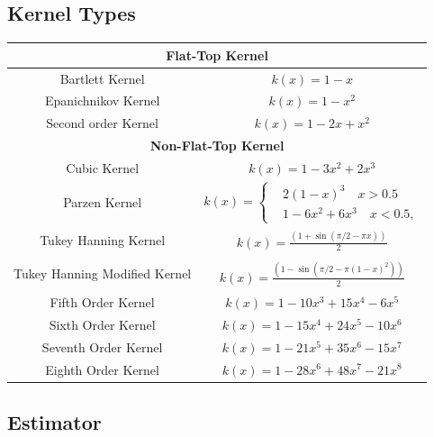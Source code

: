 \documentclass[letterpaper]{report}
\newcounter{N}
\begin{document}
\subsection{Kernel Types}
\begin{center}
\begin{tabular}{|c|c|}
\hline
\multicolumn{2}{|c|}{\rule{0pt}{18pt} \textbf{Flat-Top Kernel}}\\
\hline
\rule{0pt}{18pt} {Bartlett Kernel} & $k(x) = 1-x$\\
\hline
\rule{0pt}{18pt}{Epanichnikov Kernel} & $k(x) = 1-x^2$\\
\hline
\rule{0pt}{18pt}{Second order Kernel} & $k(x) = 1 - 2x + x^2$\\
\hline
\multicolumn{2}{|c|}{\rule{0pt}{18pt} \textbf{Non-Flat-Top Kernel}}\\
\hline
\rule{0pt}{18pt} {Cubic Kernel} & $k(x) = 1-3x^2+2x^3$\\
\hline
\rule{0pt}{34pt} {Parzen Kernel} & $k(x) = \left\{\begin{aligned}
& 2(1-x)^3 \quad x>0.5\\
& 1- 6x^2 +6x^3 \quad x<0.5,
\end{aligned}\right.$\\
\hline
\rule{0pt}{34pt} {Tukey Hanning Kernel} & $\begin{aligned}
k(x) = \frac{(1 + \sin(\pi/2 - \pi x))}{2}
\end{aligned}$\\
\hline
\rule{0pt}{34pt} {Tukey Hanning Modified Kernel} & $\begin{aligned} k(x) = \frac{(1 - \sin(\pi/2 - \pi (1 -
x)^2))}{2}\end{aligned}$\\
\hline
\rule{0pt}{18pt} {Fifth Order Kernel} & $k(x) = 1-10x^3 + 15x^4 - 6x^5$\\
\hline
\rule{0pt}{18pt} {Sixth Order Kernel} & $k(x) = 1 - 15x^4 + 24x^5 - 10x^6$\\
\hline
\rule{0pt}{18pt} {Seventh Order Kernel} & $k(x) = 1 - 21x^5 + 35x^6 - 15x^7$\\
\hline
\rule{0pt}{18pt} {Eighth Order Kernel} & $k(x) = 1 - 28x^6 + 48x^7 - 21x^8$\\
\hline
\end{tabular}
\end{center}
\subsection{Estimator}
\end{document}
